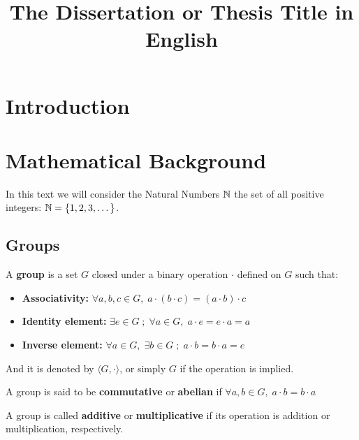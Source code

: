 \documentclass[Ingles]{ic-tese-v3}
\date{}
\title{}
\begin{document}

\title{The Dissertation or Thesis Title in English}


\mestrado


\paginasiniciais



\chapter{Introduction}
\label{sec:org75159e2}

\chapter{Mathematical Background}
\label{sec:org4940c6e}
In this text we will consider the Natural Numbers \(\mathbb{N}\) the set of all positive integers: \(\mathbb{N} = \{1,2,3,\dots\}\).
\section{Groups}
\label{sec:orgdaa5734}

   \begin{definition}
  A \textbf{group} is a set $G$ closed under a binary operation $\cdot$ defined on $G$ such
  that:
  \begin{itemize}
  \item \textbf{Associativity: } $\forall a,b,c \in G, \; a\cdot(b\cdot c) = (a\cdot b)\cdot c$
  \item \textbf{Identity element: } $\exists e \in G \; ; \; \forall a \in G, \; a\cdot e = e\cdot a = a$
  \item \textbf{Inverse element: } $\forall a \in G, \; \exists b \in G \; ; \; a\cdot b = b \cdot a = e$
  \end{itemize}
And it is denoted by $\langle G,\cdot\rangle$, or simply $G$ if the operation is implied.
\end{definition}

\begin{definition}
  A group is said to be \textbf{commutative} or \textbf{abelian}
  if $\forall a, b \in G, \; a\cdot b = b\cdot a$
\end{definition}

\noindent
A group is called \textbf{additive} or \textbf{multiplicative} if its
operation is addition or multiplication, respectively.
\end{document}
